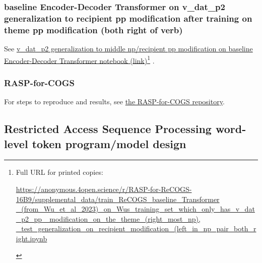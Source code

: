 \documentclass[11pt]{article}
\begin{document}
\subsubsection{\cite{Wu2023} baseline Encoder-Decoder Transformer on v\_dat\_p2 generalization to recipient pp modification after training on theme pp modification (both right of verb)}


See \href{https://anonymous.4open.science/r/RASP-for-ReCOGS-16B9/supplemental\_data/train\_ReCOGS\_baseline\_Transformer\_(from\_Wu\_et\_al\_2023)\_on\_Wus\_training\_set\_which\_only\_has\_v\_dat\_p2\_pp\_modification\_on\_the\_theme\_(right\_most\_np),\_test\_generalization\_on\_recipient\_modification\_(left\_in\_np\_pair\_both\_right.ipynb}{v\_dat\_p2 generalization to middle np/recipient pp modification on baseline Encoder-Decoder Transformer notebook (link)}\footnote{\begin{footnotesize}Full URL for printed copies: 

\href{https://anonymous.4open.science/r/RASP-for-ReCOGS-16B9/supplemental\_data/train\_ReCOGS\_baseline\_Transformer\_(from\_Wu\_et\_al\_2023)\_on\_Wus\_training\_set\_which\_only\_has\_v\_dat\_p2\_pp\_modification\_on\_the\_theme\_(right\_most\_np),\_test\_generalization\_on\_recipient\_modification\_(left\_in\_np\_pair\_both\_right.ipynb}{https://anonymous.4open.science/r/RASP-for-ReCOGS-16B9/supplemental\_data/train\_ReCOGS\_baseline\_Transformer
\_(from\_Wu\_et\_al\_2023)\_on\_Wus\_training\_set\_which\_only\_has\_v\_dat\_p2\_pp
\_modification\_on\_the\_theme\_(right\_most\_np),
\_test\_generalization\_on\_recipient\_modification\_(left\_in\_np\_pair\_both\_right.ipynb}
\end{footnotesize}} .

\subsubsection{RASP-for-COGS}

For steps to reproduce and results, see \href{https://anonymous.4open.science/r/RASP-for-COGS-102F/}{the RASP-for-COGS repository}.

\twocolumn

\clearpage

\subsection{Restricted Access Sequence Processing word-level token program/model design}
\label{rasp-word-level-model-design}
\end{document}
